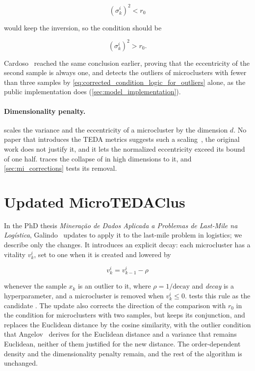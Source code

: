 \begin{equation}
    \left( \sigma^i_k \right)^2 < r_0
    \label{eq:corrected_condition_logic}
\end{equation}

would keep the inversion, so the condition should be

\begin{equation}
    \left( \sigma^i_k \right)^2 > r_0.
    \label{eq:corrected_condition_logic_for_outliers}
\end{equation}

Cardoso~\cite{cardoso2022microtedaclus} reached the same conclusion earlier, proving that the eccentricity of the second sample is always one, and detects the outliers of microclusters with fewer than three samples by \cref{eq:corrected_condition_logic_for_outliers} alone, as the public implementation does (\cref{sec:model_implementation}).

\paragraph{Dimensionality penalty.}
\label{subsubsec:dimensionality_penalty}
 scales the variance and the eccentricity of a microcluster by the dimension $d$. No paper that introduces the TEDA metrics suggests such a scaling~\cite{angelov2014outside,angelov2014anomaly}, the original work does not justify it, and it lets the normalized eccentricity exceed its bound of one half.  traces the collapse of \MicroTEDAClus in high dimensions to it, and \cref{sec:mi_corrections} tests its removal.

\section{Updated MicroTEDAClus}
\label{sec:updated_formulation}

In the PhD thesis \textit{Mineração de Dados Aplicada a Problemas de Last-Mile na Logística}, Galindo~\cite{galindo2021lastmile} updates \MicroTEDAClus to apply it to the last-mile problem in logistics; we describe only the changes. It introduces an explicit decay: each microcluster has a vitality $v^i_k$, set to one when it is created and lowered by

\begin{equation}
    v^i_k = v^i_{k-1} - \rho
    \label{eq:decay_logic}
\end{equation}

whenever the sample $x_k$ is an outlier to it, where $\rho = 1/\text{decay}$ and \textit{decay} is a hyperparameter, and a microcluster is removed when $v^i_k \le 0$.  tests this rule as the candidate . The update also corrects the direction of the comparison with $r_0$ in the condition for microclusters with two samples, but keeps its conjunction, and replaces the Euclidean distance by the cosine similarity, with the outlier condition that Angelov~\cite{angelov2014anomaly} derives for the Euclidean distance and a variance that remains Euclidean, neither of them justified for the new distance. The order-dependent density and the dimensionality penalty remain, and the rest of the algorithm is unchanged.

